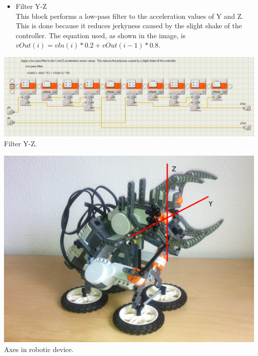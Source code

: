 \documentclass[a4paper,11pt]{article}
\begin{document}
	\begin{multicols}{2}

			\begin{itemize}
				\item Filter Y-Z\\
				
				This block performs a low-pass filter to the acceleration values of Y and Z. This is done because it reduces jerkyness caused by the slight shake of the controller. The equation used, as shown in the image, is $vOut(i) = vln(i) * 0.2 + vOut(i - 1) * 0.8$.
			\end{itemize}

	\end{multicols}

			\begin{center}
				\includegraphics[scale=0.5]{img/SW_FilterYZ.png}\\
				Filter Y-Z.
			\end{center}

			\begin{center}
				\includegraphics[scale=0.3]{img/robot4.png}\\
				Axes in robotic device.
			\end{center}
\end{document}
